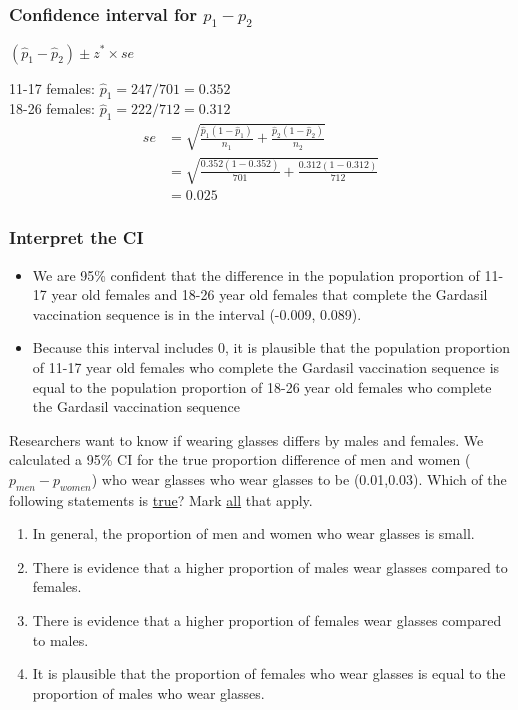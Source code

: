 \begin{frame}
\frametitle{Confidence interval for $p_1-p_2$}
\begin{center}
$(\hat{p}_1-\hat{p}_2) \pm z^*\times se$
\end{center}
\vskip10pt
11-17 females: $\hat{p}_1=247/701=0.352$ \\
18-26 females: $\hat{p}_1=222/712=0.312$
\begin{align*}
     se&=\sqrt{\frac{\hat{p}_1(1-\hat{p}_1)}{n_1}+\frac{\hat{p}_2(1-\hat{p}_2)}{n_2}}\\
    &=\sqrt{\frac{0.352(1-0.352)}{701}+\frac{0.312(1-0.312)}{712}}\\
    &=0.025
\end{align*}
\end{frame}

\begin{frame}
\frametitle{Interpret the CI}
\begin{itemize}
    \item
    We are 95\% confident that the difference in the population proportion of 11-17 year old females and 18-26 year old females that complete the Gardasil vaccination sequence is in the interval (-0.009, 0.089).
    \item
    Because this interval includes 0, it is plausible that the population proportion of 11-17 year old females who complete the Gardasil vaccination sequence is equal to the population proportion of 18-26 year old females who complete the Gardasil vaccination sequence
\end{itemize}
\end{frame}

\begin{frame}
\begin{clicker}{Researchers want to know if wearing glasses differs by males and females.  We calculated a 95\% CI for the true proportion difference of men and women ($p_{men}-p_{women}$) who wear glasses who wear glasses to be (0.01,0.03).  Which of the following statements is \underline{true}? Mark \underline{all} that apply.}
\begin{enumerate}
    \item
    In general, the proportion of men and women who wear glasses is small.
    \item
    There is evidence that a higher proportion of males wear glasses compared to females.
    \item
    There is evidence that a higher proportion of females wear glasses compared to males.
    \item
    It is plausible that the proportion of females who wear glasses is equal to the proportion of males who wear glasses.
\end{enumerate}
\end{clicker}
\end{frame}

